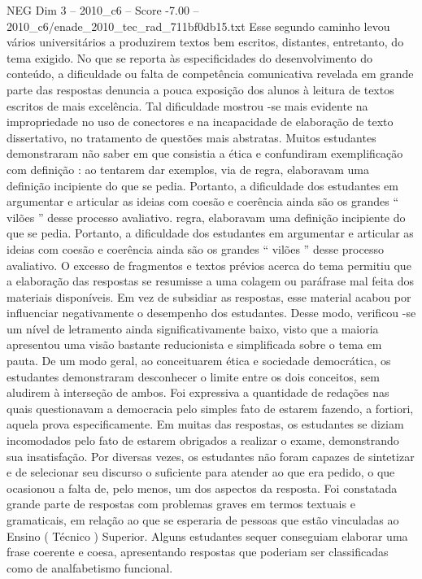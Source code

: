 \begin{textsample}{NEG Dim 3 – 2010\_c6 – Score -7.00 – 2010\_c6/enade\_2010\_tec\_rad\_711bf0db15.txt}
Esse segundo caminho levou vários universitários a produzirem textos bem escritos, distantes, entretanto, do tema exigido.
No que se reporta às especificidades do desenvolvimento do conteúdo, a dificuldade ou falta de competência comunicativa revelada em grande parte das respostas denuncia a pouca exposição dos alunos à leitura de textos escritos de mais excelência.
Tal dificuldade mostrou -se mais evidente na impropriedade no uso de conectores e na incapacidade de elaboração de texto dissertativo, no tratamento de questões mais abstratas.
Muitos estudantes demonstraram não saber em que consistia a ética e confundiram exemplificação com definição : ao tentarem dar exemplos, via de regra, elaboravam uma definição incipiente do que se pedia.
Portanto, a dificuldade dos estudantes em argumentar e articular as ideias com coesão e coerência ainda são os grandes “ vilões ” desse processo avaliativo. regra, elaboravam uma definição incipiente do que se pedia.
Portanto, a dificuldade dos estudantes em argumentar e articular as ideias com coesão e coerência ainda são os grandes “ vilões ” desse processo avaliativo.
O excesso de fragmentos e textos prévios acerca do tema permitiu que a elaboração das respostas se resumisse a uma colagem ou paráfrase mal feita dos materiais disponíveis.
Em vez de subsidiar as respostas, esse material acabou por influenciar negativamente o desempenho dos estudantes.
Desse modo, verificou -se um nível de letramento ainda significativamente baixo, visto que a maioria apresentou uma visão bastante reducionista e simplificada sobre o tema em pauta.
De um modo geral, ao conceituarem ética e sociedade democrática, os estudantes demonstraram desconhecer o limite entre os dois conceitos, sem aludirem à interseção de ambos.
Foi expressiva a quantidade de redações nas quais questionavam a democracia pelo simples fato de estarem fazendo, a fortiori, aquela prova especificamente.
Em muitas das respostas, os estudantes se diziam incomodados pelo fato de estarem obrigados a realizar o exame, demonstrando sua insatisfação.
Por diversas vezes, os estudantes não foram capazes de sintetizar e de selecionar seu discurso o suficiente para atender ao que era pedido, o que ocasionou a falta de, pelo menos, um dos aspectos da resposta.
Foi constatada grande parte de respostas com problemas graves em termos textuais e gramaticais, em relação ao que se esperaria de pessoas que estão vinculadas ao Ensino ( Técnico ) Superior.
Alguns estudantes sequer conseguiam elaborar uma frase coerente e coesa, apresentando respostas que poderiam ser classificadas como de analfabetismo funcional.

\end{textsample}
